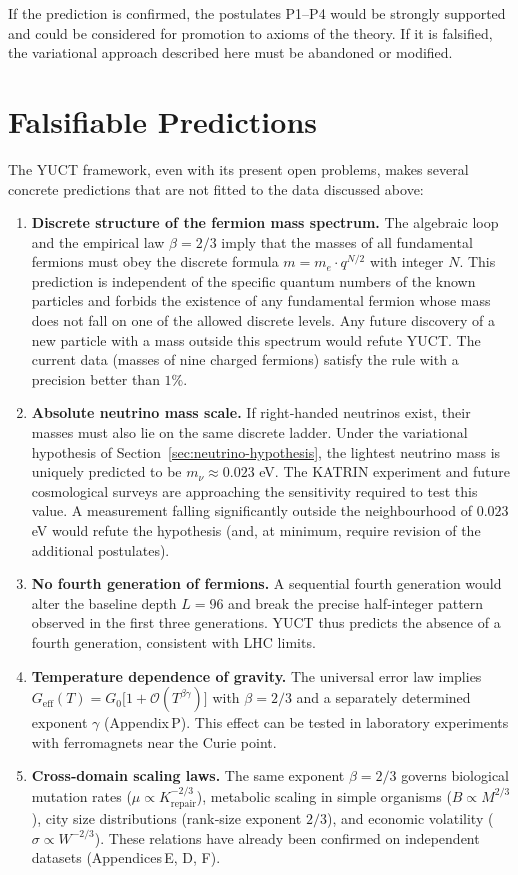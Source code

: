 \documentclass[12pt,a4paper]{article}
\begin{document}
	If the prediction is confirmed, the postulates P1--P4 would be strongly supported and could be considered for promotion to axioms of the theory.  If it is falsified, the variational approach described here must be abandoned or modified.
	
	\section{Falsifiable Predictions}
	
	The YUCT framework, even with its present open problems, makes several concrete predictions that are not fitted to the data discussed above:
	
	\begin{enumerate}[label=(\arabic*)]
		\item \textbf{Discrete structure of the fermion mass spectrum.}  The algebraic loop and the empirical law \(\beta = 2/3\) imply that the masses of all fundamental fermions must obey the discrete formula \(m = m_e \cdot q^{N/2}\) with integer \(N\).  This prediction is independent of the specific quantum numbers of the known particles and forbids the existence of any fundamental fermion whose mass does not fall on one of the allowed discrete levels.  Any future discovery of a new particle with a mass outside this spectrum would refute YUCT.  The current data (masses of nine charged fermions) satisfy the rule with a precision better than \(1\%\).
		\item \textbf{Absolute neutrino mass scale.}  If right‑handed neutrinos exist, their masses must also lie on the same discrete ladder.  Under the variational hypothesis of Section~\ref{sec:neutrino-hypothesis}, the lightest neutrino mass is uniquely predicted to be \(m_{\nu} \approx 0.023\) eV.  The KATRIN experiment and future cosmological surveys are approaching the sensitivity required to test this value.  A measurement falling significantly outside the neighbourhood of \(0.023\) eV would refute the hypothesis (and, at minimum, require revision of the additional postulates).
		\item \textbf{No fourth generation of fermions.}  A sequential fourth generation would alter the baseline depth \(L = 96\) and break the precise half‑integer pattern observed in the first three generations.  YUCT thus predicts the absence of a fourth generation, consistent with LHC limits.
		\item \textbf{Temperature dependence of gravity.}  The universal error law implies \(G_{\mathrm{eff}}(T) = G_0\bigl[1 + \mathcal{O}(T^{\beta\gamma})\bigr]\) with \(\beta = 2/3\) and a separately determined exponent \(\gamma\) (Appendix P).  This effect can be tested in laboratory experiments with ferromagnets near the Curie point.
		\item \textbf{Cross‑domain scaling laws.}  The same exponent \(\beta = 2/3\) governs biological mutation rates (\(\mu \propto K_{\mathrm{repair}}^{-2/3}\)), metabolic scaling in simple organisms (\(B \propto M^{2/3}\)), city size distributions (rank‑size exponent \(2/3\)), and economic volatility (\(\sigma \propto W^{-2/3}\)).  These relations have already been confirmed on independent datasets (Appendices E, D, F).
	\end{enumerate}
	
\end{document}
